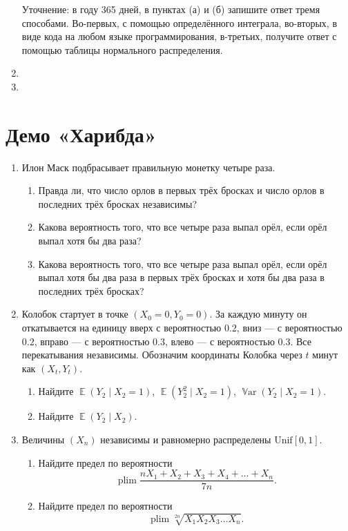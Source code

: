 \documentclass[12pt]{article}
\DeclareMathOperator{\Var}{\mathbb{V}ar}
\DeclareMathOperator{\plim}{plim}
\DeclareMathOperator{\E}{\mathbb{E}}
\newcommand \dUnif{\mathrm{Unif}}
\begin{document}
\begin{enumerate}
Уточнение: в году 365 дней, в пунктах (а) и (б) запишите ответ тремя способами.
Во-первых, с помощью определённого интеграла, во-вторых, в виде кода на любом языке программирования, 
в-третьих, получите ответ с помощью таблицы нормального распределения. 

\item 
\item 



\end{enumerate}

\section*{Демо «Харибда»}
\begin{enumerate}
\item Илон Маск подбрасывает правильную монетку четыре раза. 
\begin{enumerate}
    \item Правда ли, что число орлов в первых трёх бросках и число орлов в последних трёх бросках независимы?
    \item Какова вероятность того, что все четыре раза выпал орёл, если орёл выпал хотя бы два раза?
    \item Какова вероятность того, что все четыре раза выпал орёл, если орёл выпал хотя бы два раза в первых трёх бросках и хотя бы два раза в последних трёх бросках?
\end{enumerate}

\item Колобок стартует в точке $(X_0=0, Y_0=0)$.
За каждую минуту он откатывается на единицу вверх с вероятностью $0.2$, вниз — с вероятностью $0.2$, вправо — с вероятностью $0.3$, влево — с вероятностью $0.3$.
Все перекатывания независимы. 
Обозначим координаты Колобка через $t$ минут как $(X_t, Y_t)$.
\begin{enumerate}
    \item Найдите $\E(Y_2 \mid X_2 = 1)$, $\E(Y_2^2 \mid X_2 = 1)$, $\Var(Y_2 \mid X_2 = 1)$.
    \item Найдите $\E(Y_2 \mid X_2)$.
\end{enumerate}

\item Величины $(X_n)$ независимы и равномерно распределены $\dUnif[0, 1]$.

\begin{enumerate}
  \item Найдите предел по вероятности
  \[
  \plim \frac{nX_1 + X_2 + X_3  + X_4 + \dots + X_n}{7n}.
  \]
  \item Найдите предел по вероятности
  \[
  \plim \sqrt[2n]{X_1 X_2 X_3 \dots X_n}.
  \]
\end{enumerate}


\end{enumerate}
\end{document}
